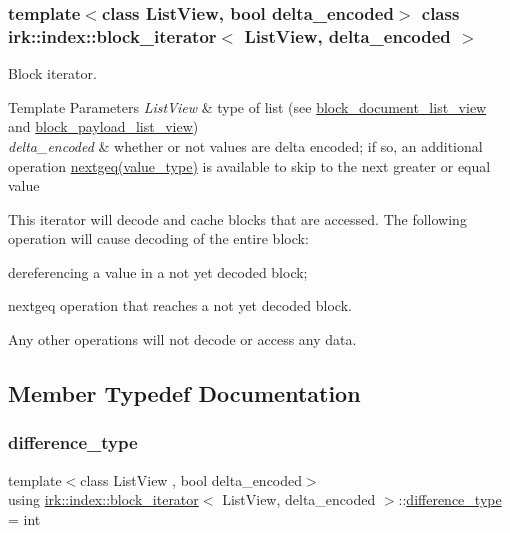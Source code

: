 \subsubsection*{template$<$class List\+View, bool delta\+\_\+encoded$>$\newline
class irk\+::index\+::block\+\_\+iterator$<$ List\+View, delta\+\_\+encoded $>$}

Block iterator. 


\begin{DoxyTemplParams}{Template Parameters}
{\em List\+View} & type of list (see \mbox{\hyperlink{classirk_1_1index_1_1block__document__list__view}{block\+\_\+document\+\_\+list\+\_\+view}} and \mbox{\hyperlink{classirk_1_1index_1_1block__payload__list__view}{block\+\_\+payload\+\_\+list\+\_\+view}}) \\
\hline
{\em delta\+\_\+encoded} & whether or not values are delta encoded; if so, an additional operation {\ttfamily \mbox{\hyperlink{classirk_1_1index_1_1block__iterator_aff7b154913783f7984e50c11efa10cb1}{nextgeq(value\+\_\+type)}}} is available to skip to the next greater or equal value\\
\hline
\end{DoxyTemplParams}
This iterator will decode and cache blocks that are accessed. The following operation will cause decoding of the entire block\+:
\begin{DoxyItemize}
\item dereferencing a value in a not yet decoded block;
\item {\ttfamily nextgeq} operation that reaches a not yet decoded block.
\end{DoxyItemize}

Any other operations will not decode or access any data. 

\subsection{Member Typedef Documentation}
\mbox{\label{classirk_1_1index_1_1block__iterator_abb90b6c7a6100113770359e6eb9dd8cf}} 
\subsubsection{\texorpdfstring{difference\+\_\+type}{difference\_type}}
{\footnotesize\ttfamily template$<$class List\+View , bool delta\+\_\+encoded$>$ \\
using \mbox{\hyperlink{classirk_1_1index_1_1block__iterator}{irk\+::index\+::block\+\_\+iterator}}$<$ List\+View, delta\+\_\+encoded $>$\+::\mbox{\hyperlink{classirk_1_1index_1_1block__iterator_abb90b6c7a6100113770359e6eb9dd8cf}{difference\+\_\+type}} =  int}

